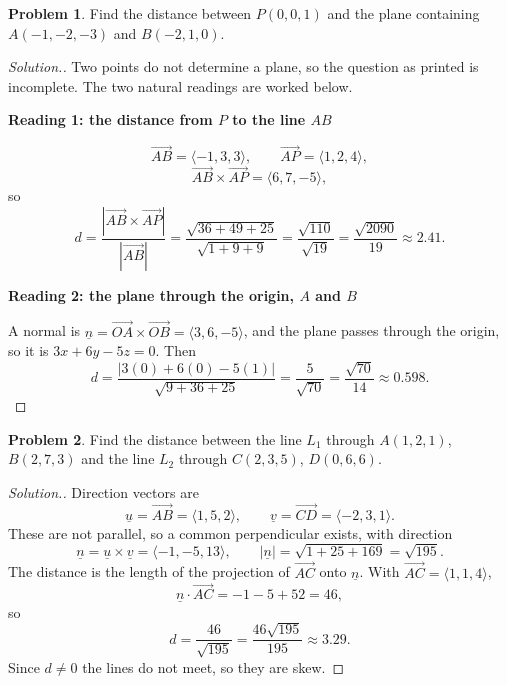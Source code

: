 \documentclass[11pt,a4paper]{article}
\theoremstyle{definition}
\newtheorem{problemx}{Problem}[subsection]
\newenvironment{problem}{\begin{problemx}}{\end{problemx}}
\newenvironment{solution}
  {\renewcommand{\qedsymbol}{}\begin{proof}[\textit{Solution}.]}
  {\end{proof}}
\newcommand{\subhead}[1]{%
  \par\medskip\noindent\textbf{#1}\par\nobreak\smallskip}
\begin{document}
\begin{problem}
Find the distance between $P(0,0,1)$ and the plane containing
$A(-1,-2,-3)$ and $B(-2,1,0)$.
\end{problem}
\begin{solution}
Two points do not determine a plane, so the question as printed is incomplete.
The two natural readings are worked below.

\subhead{Reading 1: the distance from $P$ to the line $AB$}
$$\overrightarrow{AB} = \langle -1,3,3\rangle,\qquad
\overrightarrow{AP} = \langle 1,2,4\rangle ,$$
$$\overrightarrow{AB}\times\overrightarrow{AP} = \langle 6,7,-5\rangle ,$$
so
$$d = \frac{\left|\overrightarrow{AB}\times\overrightarrow{AP}\right|}
{\left|\overrightarrow{AB}\right|}
= \frac{\sqrt{36+49+25}}{\sqrt{1+9+9}} = \frac{\sqrt{110}}{\sqrt{19}}
= \frac{\sqrt{2090}}{19}\approx 2.41 .$$

\subhead{Reading 2: the plane through the origin, $A$ and $B$}
A normal is
$\underline{n} = \overrightarrow{OA}\times\overrightarrow{OB}
= \langle 3,6,-5\rangle$, and the plane passes through the origin, so it is
$3x+6y-5z = 0$. Then
$$d = \frac{\left|3(0)+6(0)-5(1)\right|}{\sqrt{9+36+25}}
= \frac{5}{\sqrt{70}} = \frac{\sqrt{70}}{14}\approx 0.598 .$$
\end{solution}

\begin{problem}
Find the distance between the line $L_1$ through $A(1,2,1)$, $B(2,7,3)$ and the
line $L_2$ through $C(2,3,5)$, $D(0,6,6)$.
\end{problem}
\begin{solution}
Direction vectors are
$$\underline{u} = \overrightarrow{AB} = \langle 1,5,2\rangle,\qquad
\underline{v} = \overrightarrow{CD} = \langle -2,3,1\rangle .$$
These are not parallel, so a common perpendicular exists, with direction
$$\underline{n} = \underline{u}\times\underline{v} = \langle -1,-5,13\rangle,
\qquad \left|\underline{n}\right| = \sqrt{1+25+169} = \sqrt{195}.$$
The distance is the length of the projection of $\overrightarrow{AC}$ onto
$\underline{n}$. With $\overrightarrow{AC} = \langle 1,1,4\rangle$,
$$\underline{n}\cdot\overrightarrow{AC} = -1 - 5 + 52 = 46 ,$$
so
$$d = \frac{46}{\sqrt{195}} = \frac{46\sqrt{195}}{195}\approx 3.29 .$$
Since $d\neq 0$ the lines do not meet, so they are skew.
\end{solution}
\end{document}
